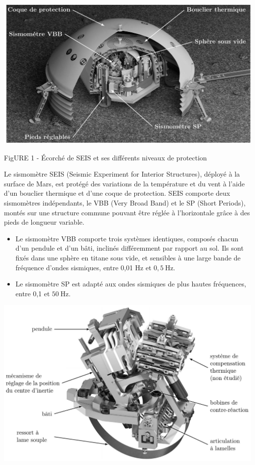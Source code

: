 \documentclass[10pt]{article}
\begin{document}
\begin{center}
\includegraphics[max width=\textwidth]{2024_04_26_3285cfc264024262add0g-02}
\end{center}

FigURE 1 - Écorché de SEIS et ses différents niveaux de protection

Le sismomètre SEIS (Seismic Experiment for Interior Structures), déployé à la surface de Mars, est protégé des variations de la température et du vent à l'aide d'un bouclier thermique et d'une coque de protection. SEIS comporte deux sismomètres indépendants, le VBB (Very Broad Band) et le SP (Short Periods), montés sur une structure commune pouvant être réglée à l'horizontale grâce à des pieds de longueur variable.

\begin{itemize}
  \item Le sismomètre VBB comporte trois systèmes identiques, composés chacun d'un pendule et d'un bâti, inclinés différemment par rapport au sol. Ils sont fixés dans une sphère en titane sous vide, et sensibles à une large bande de fréquence d'ondes sismiques, entre 0,01 Hz et $0,5 \mathrm{~Hz}$.
  \item Le sismomètre SP est adapté aux ondes sismiques de plus hautes fréquences, entre 0,1 et $50 \mathrm{~Hz}$.
\end{itemize}

\begin{center}
\includegraphics[max width=\textwidth]{2024_04_26_3285cfc264024262add0g-03}
\end{center}
\end{document}
